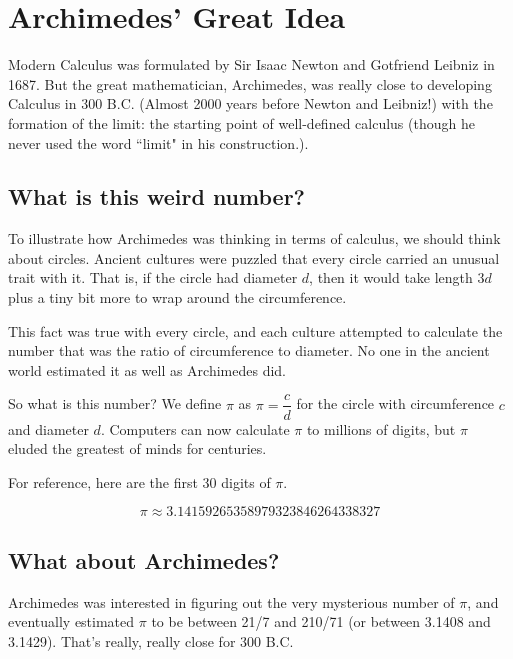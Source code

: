 
\section{Archimedes' Great Idea}

 Modern Calculus was formulated by Sir Isaac Newton and Gotfriend Leibniz in 1687. But the great mathematician, Archimedes, was really close to developing Calculus in 300 B.C. (Almost 2000 years before Newton and Leibniz!) with the formation of the limit: the starting point of well-defined calculus (though he never used the word ``limit" in his construction.). 
 
\subsection{What is this weird number?}

To illustrate how Archimedes was thinking in terms of calculus, we should think about circles. Ancient cultures were puzzled that every circle carried an unusual trait with it. That is, if the circle had diameter $d$, then it would take length $3d$ plus a tiny bit more to wrap around the circumference. 

\noindent This fact was true with every circle, and each culture attempted to calculate the number that was the ratio of circumference to diameter. No one in the ancient world estimated it as well as Archimedes did.

\noindent So what is this number? We define $\pi$ as $\pi = \dfrac{c}{d}$ for the circle with circumference $c$ and diameter $d$. Computers can now calculate $\pi$ to millions of digits, but $\pi$ eluded the greatest of minds for centuries.

\noindent For reference, here are the first 30 digits of $\pi$.

\begin{equation*}
    \pi \approx 3.14159265358979323846264338327
\end{equation*}

\subsection{What about Archimedes?}

Archimedes was interested in figuring out the very mysterious number of $\pi$, and eventually estimated $\pi$ to be between 21/7 and 210/71 (or between 3.1408 and 3.1429). That's really, really close for 300 B.C.

